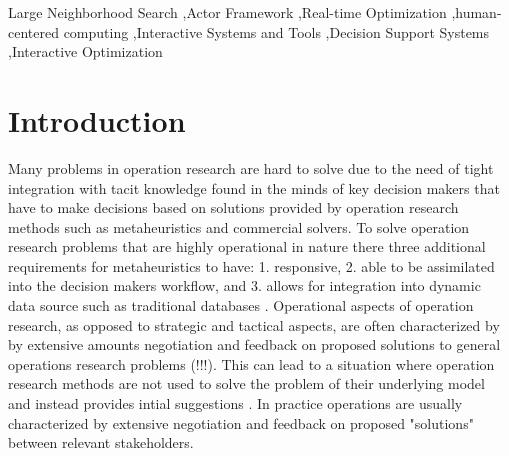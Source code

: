 \documentclass[preprint,12pt,authoryear]{elsarticle}
\begin{document}
\begin{frontmatter}
\begin{keyword}
Large Neighborhood Search \sep Actor Framework \sep Real-time Optimization \sep human-centered computing \sep Interactive Systems and Tools \sep Decision Support Systems \sep Interactive Optimization




\end{keyword}

\end{frontmatter}



\section{Introduction}
\label{sec:1-introduction}

Many problems in operation research are hard to solve due to the need of tight integration with tacit knowledge found in the minds of key decision makers 
that have to make decisions based on solutions provided by operation research methods such as metaheuristics and commercial solvers. 
To solve operation research problems that are highly operational in nature there three additional requirements for metaheuristics to have: 1.  
responsive, 2. able to be assimilated into the decision makers workflow, and 3. allows for integration into dynamic data source such as traditional databases \citep{meignan_review_2015}. 
Operational aspects of operation research, as opposed to strategic and tactical aspects, are often characterized by by extensive amounts negotiation and feedback on 
proposed solutions to general operations research problems (!!!). This can lead to a situation
where operation research methods are not used to solve the problem of their underlying model and instead provides intial suggestions \cite{meignan_review_2015}. In practice
operations are usually characterized by extensive negotiation and feedback on proposed "solutions" between relevant stakeholders.  
\end{document}
